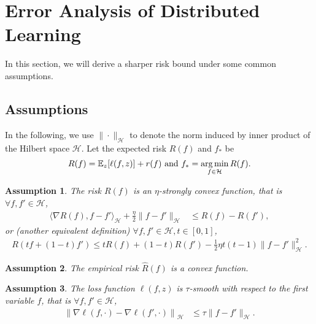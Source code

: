 \documentclass{article}
\newcommand{\argmin}{\operatornamewithlimits{arg\,min}}
\newtheorem{assumption}{Assumption}
\begin{document}
\section{Error Analysis of Distributed Learning}
In this section, we will derive a sharper risk bound under some common assumptions.
\subsection{Assumptions}
In the following, we use $\|\cdot\|_\mathcal{H}$ to denote the norm induced by inner product of the Hilbert space $\mathcal{H}$.
Let the expected risk  $R(f)$ and $f_\ast$ be
\begin{align*}
  R(f)=\mathbb{E}_{z}[\ell(f,z)]+r(f) \text{ and } f_\ast=\argmin_{f\in\mathcal{H}}R(f).
\end{align*}
\begin{assumption}
\label{assumption-strongly}
  The risk $R(f)$ is an $\eta$-strongly convex function,
  that is $\forall f,f'\in\mathcal{H}$,
  \begin{align}
    \label{assumption-strongly-equation}
     \langle \nabla R(f), f-f'\rangle_\mathcal{H}+\frac{\eta}{2}\|f-f'\|_\mathcal{H} &\leq R(f)-R(f'),
  \end{align}
  or (another equivalent definition)
  $\forall  f,f'\in\mathcal{H}, t\in[0,1]$,
  \begin{align}
  \label{assumption-strongly-second}
  R(tf+(1-t)f') \leq  tR(f)+(1-t)R(f')-\frac{1}{2}\eta t(t-1)\|f-f'\|_\mathcal{H}^2.
  \end{align}
\end{assumption}
\begin{assumption}
\label{assumption-strongly-emprical}
  The empirical risk $\hat{R}(f)$  is a convex function.
\end{assumption}
\begin{assumption}
\label{assumption-smooth-loss}
  The loss function $\ell(f,z)$ is $\tau$-smooth with respect to the first variable $f$,
  that is $\forall f,f'\in\mathcal{H}$,
  \begin{align}
     \label{assumption-smooth-equaiton-loss}
     \left\|\nabla\ell(f,\cdot)-\nabla \ell(f',\cdot)\right\|_\mathcal{H}&\leq \tau\|f-f'\|_\mathcal{H}.
  \end{align}
\end{assumption}
\end{document}
